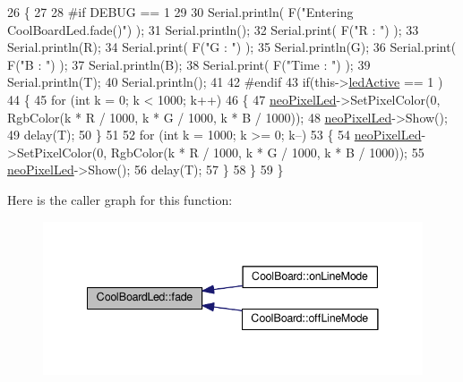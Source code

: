\begin{DoxyCode}
26 \{
27 
28 \textcolor{preprocessor}{#if DEBUG == 1}
29 
30     Serial.println( F(\textcolor{stringliteral}{"Entering CoolBoardLed.fade()"}) );
31     Serial.println();
32     Serial.print( F(\textcolor{stringliteral}{"R : "}) );
33     Serial.println(R);
34     Serial.print( F(\textcolor{stringliteral}{"G : "}) );
35     Serial.println(G);
36     Serial.print( F(\textcolor{stringliteral}{"B : "}) );
37     Serial.println(B);
38     Serial.print( F(\textcolor{stringliteral}{"Time : "}) );
39     Serial.println(T);
40     Serial.println();
41 
42 \textcolor{preprocessor}{#endif  }
43     \textcolor{keywordflow}{if}(this->\hyperlink{class_cool_board_led_a5f17c135516fcf4b44ea8a096ba0177a}{ledActive} == 1 )
44     \{
45         \textcolor{keywordflow}{for} (\textcolor{keywordtype}{int} k = 0; k < 1000; k++) 
46         \{
47             \hyperlink{class_cool_board_led_ac2c13fa462a010cd9242bf297c013923}{neoPixelLed}->SetPixelColor(0, RgbColor(k * R / 1000, k * G / 1000, k * B / 1000));
48             \hyperlink{class_cool_board_led_ac2c13fa462a010cd9242bf297c013923}{neoPixelLed}->Show();
49             delay(T);
50         \}
51         
52         \textcolor{keywordflow}{for} (\textcolor{keywordtype}{int} k = 1000; k >= 0; k--) 
53         \{
54             \hyperlink{class_cool_board_led_ac2c13fa462a010cd9242bf297c013923}{neoPixelLed}->SetPixelColor(0, RgbColor(k * R / 1000, k * G / 1000, k * B / 1000));
55             \hyperlink{class_cool_board_led_ac2c13fa462a010cd9242bf297c013923}{neoPixelLed}->Show();
56             delay(T);
57         \}
58     \}
59 \}
\end{DoxyCode}
Here is the caller graph for this function\+:\nopagebreak
\begin{figure}[H]
\begin{center}
\leavevmode
\includegraphics[width=341pt]{de/dc0/class_cool_board_led_af1cacbaa88db8bcf6042c1083ba41155_icgraph}
\end{center}
\end{figure}
\mbox{\label{class_cool_board_led_ab778f5e7bed0ab74e3906d82110493c3}} 
